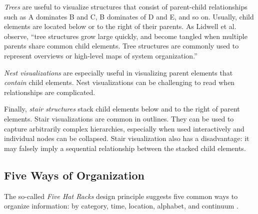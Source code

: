 \emph{Trees} are useful to visualize structures that consist of parent-child relationships such as A dominates B and C, B dominates of D and E, and so on. 
Usually, child elements are located below or to the right of their parents. As Lidwell et al. \cite{Lidwell10} observe, ``tree structures grow large quickly, and become tangled when multiple parents share common child elements. Tree structures are commonly used to represent overviews or high-level maps of system organization.''

\emph{Nest visualizations} are especially useful in visualizing parent elements that \emph{contain} child elements. Nest visualizations can be challenging to read when relationships are complicated.

Finally, \emph{stair structures} stack child elements below and to the right of parent elements. Stair visualizations are common in outlines. They can be used to capture arbitrarily complex hierarchies, especially when used interactively and individual nodes can be collapsed. Stair visualization also has a disadvantage: it may falsely imply a sequential relationship between the stacked child elements.

\subsection{Five Ways of Organization}
\label{sec:fivehatracks}

The so-called \emph{Five Hat Racks} design principle suggests five common ways to organize information: by category, time, location, alphabet, and continuum \cite{Lidwell10}.

